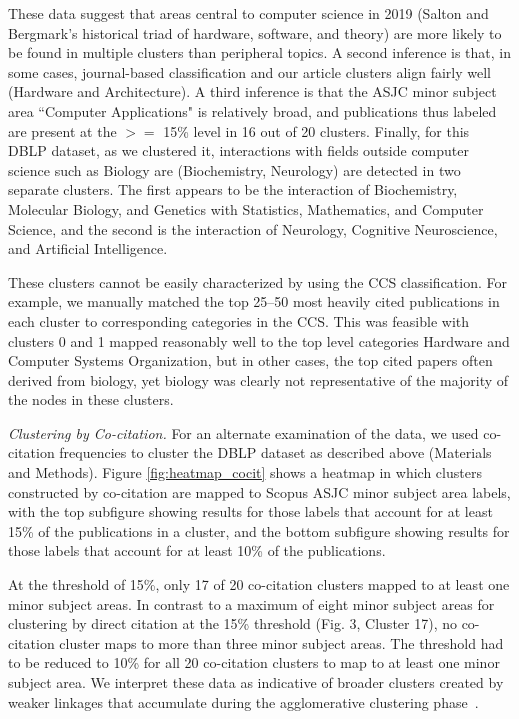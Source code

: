 These data suggest that areas central to computer science in 2019 (Salton and Bergmark's historical triad of hardware, software, and theory) are more likely to be found in multiple clusters than peripheral topics. A second inference is that, in some cases, journal-based classification and our article clusters align fairly well (Hardware and Architecture). 
A third inference is that the ASJC minor subject area ``Computer Applications" is relatively broad, and publications thus labeled are present at the $>=$ 15\% level in 16 out of 20 clusters.  Finally,   for this DBLP dataset, as we clustered it, interactions with fields outside computer science such as Biology are (Biochemistry, Neurology)  are  detected in two separate clusters. The first appears to be the interaction of Biochemistry, Molecular Biology, and Genetics with Statistics, Mathematics, and Computer Science, and the second is the interaction of Neurology, Cognitive Neuroscience, and Artificial Intelligence.

These clusters cannot be easily characterized by using the CCS classification. For example, we manually matched the top 25--50 most heavily cited publications in each cluster to corresponding categories in the CCS. This was feasible with clusters 0 and 1 mapped reasonably well to the top level categories Hardware and Computer Systems Organization, but in other cases, the top cited papers often derived from biology, yet biology was clearly not  representative of the majority of the nodes in these clusters. 

\emph{Clustering by Co-citation.} For an alternate examination of the data, we used co-citation frequencies to cluster the DBLP dataset as described above (Materials and Methods). Figure \ref{fig:heatmap_cocit} shows a heatmap in which clusters constructed by co-citation are mapped to Scopus ASJC minor subject area labels, with the top subfigure showing results for those labels that account for at least 15\% of the publications in a cluster, and the bottom subfigure showing results for those labels that account for at least 10\% of the publications. 

At the threshold of 15\%, only 17 of 20 co-citation clusters mapped to at least one minor subject areas. In contrast to a maximum of eight minor subject areas for clustering by direct citation at the 15\% threshold (Fig. 3, Cluster 17), no co-citation cluster maps to more than three minor subject areas. The threshold had to be reduced to 10\% for all 20 co-citation clusters to map to at least one minor subject area. We interpret these data as indicative of broader clusters created by weaker linkages that accumulate during the agglomerative clustering phase~\cite{small_clustering_1985}. 

